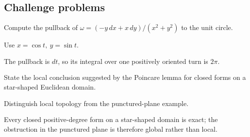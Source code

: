 \subsection*{Challenge problems}

\begin{exercise}\label{exr:vii09-ped-15}
Compute the pullback of \(\omega=(-y\,dx+x\,dy)/(x^2+y^2)\) to the unit circle.
\end{exercise}
\begin{hint}
Use \(x=\cos t,\ y=\sin t\).
\end{hint}
\begin{solution}
The pullback is \(dt\), so its integral over one positively oriented turn is \(2\pi\).
\end{solution}

\begin{exercise}\label{exr:vii09-ped-16}
State the local conclusion suggested by the Poincare lemma for closed forms on a star-shaped Euclidean domain.
\end{exercise}
\begin{hint}
Distinguish local topology from the punctured-plane example.
\end{hint}
\begin{solution}
Every closed positive-degree form on a star-shaped domain is exact; the obstruction in the punctured plane is therefore global rather than local.
\end{solution}


